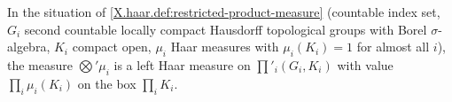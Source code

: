 In the situation of \cref{X.haar.def:restricted-product-measure} (countable index set, $G_i$ second countable locally compact Hausdorff topological groups with Borel $\sigma$-algebra, $K_i$ compact open, $\mu_i$ Haar measures with $\mu_i(K_i)=1$ for almost all $i$), the measure $\bigotimes'\mu_i$ is a left Haar measure on $\prod'_i(G_i,K_i)$ with value $\prod_i\mu_i(K_i)$ on the box $\prod_iK_i$.
